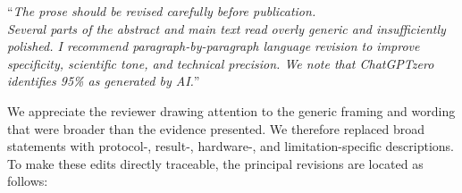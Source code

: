 \documentclass[12pt,technote,onecolumn]{IEEEtran}
\begin{document}
\vspace{4mm}

``{\it The prose should be revised carefully before publication.\\
Several parts of the abstract and main text read overly generic and
insufficiently polished. I recommend paragraph-by-paragraph language
revision to improve specificity, scientific tone, and technical
precision. We note that ChatGPTzero identifies 95\% as generated by AI.}''
\vspace{1mm}


We appreciate the reviewer drawing attention to the generic framing and wording that were broader than the evidence presented. We therefore replaced broad statements with protocol-, result-, hardware-, and limitation-specific descriptions. To make these edits directly traceable, the principal revisions are located as follows:
\end{document}
